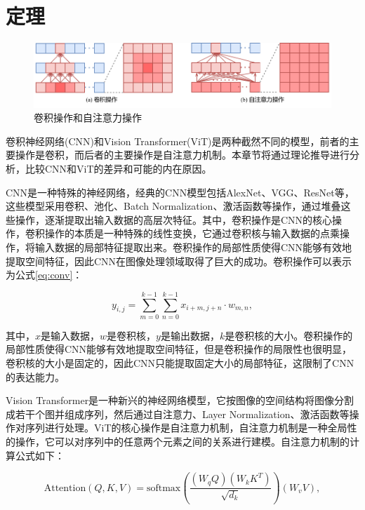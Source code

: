 \section{定理}

\begin{figure}[t]
    \centering
    \includegraphics[width=\textwidth]{pics/conv vs attention.pdf}
    \caption{卷积操作和自注意力操作}
    \label{fig:conv_vs_attention}
\end{figure}

卷积神经网络(CNN)和Vision Transformer(ViT)是两种截然不同的模型，前者的主要操作是卷积，而后者的主要操作是自注意力机制。本章节将通过理论推导进行分析，比较CNN和ViT的差异和可能的内在原因。

CNN是一种特殊的神经网络，经典的CNN模型包括AlexNet、VGG、ResNet等，这些模型采用卷积、池化、Batch Normalization、激活函数等操作，通过堆叠这些操作，逐渐提取出输入数据的高层次特征。其中，卷积操作是CNN的核心操作，卷积操作的本质是一种特殊的线性变换，它通过卷积核与输入数据的点乘操作，将输入数据的局部特征提取出来。卷积操作的局部性质使得CNN能够有效地提取空间特征，因此CNN在图像处理领域取得了巨大的成功。卷积操作可以表示为公式\ref{eq:conv}：

\begin{equation}
    \label{eq:conv}
    y_{i, j} = \sum_{m=0}^{k-1} \sum_{n=0}^{k-1} x_{i+m, j+n} \cdot w_{m, n},
\end{equation}

其中，$x$是输入数据，$w$是卷积核，$y$是输出数据，$k$是卷积核的大小。卷积操作的局部性质使得CNN能够有效地提取空间特征，但是卷积操作的局限性也很明显，卷积核的大小是固定的，因此CNN只能提取固定大小的局部特征，这限制了CNN的表达能力。

Vision Transformer是一种新兴的神经网络模型，它按图像的空间结构将图像分割成若干个图并组成序列，然后通过自注意力、Layer Normalization、激活函数等操作对序列进行处理。ViT的核心操作是自注意力机制，自注意力机制是一种全局性的操作，它可以对序列中的任意两个元素之间的关系进行建模。自注意力机制的计算公式如下：

\begin{equation}
    \label{eq:self-attention}
    \text{Attention}(Q, K, V) = \text{softmax}(\frac{(W_q Q)(W_k K^T)}{\sqrt{d_k}})(W_v V),
\end{equation}

